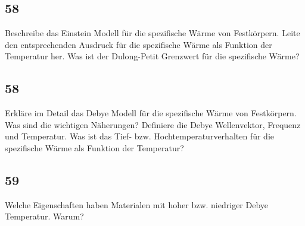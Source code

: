 \subsection{58}
\begin{myfrag}
Beschreibe das Einstein Modell für die spezifische Wärme von Festkörpern.
Leite den entsprechenden Ausdruck für die spezifische Wärme als Funktion
der Temperatur her. Was ist der Dulong-Petit Grenzwert für die spezifische
Wärme?
\end{myfrag}
\subsection{58}
\begin{myfrag}
Erkläre im Detail das Debye Modell für die spezifische Wärme von
Festkörpern. Was sind die wichtigen Näherungen? Definiere die Debye
Wellenvektor, Frequenz und Temperatur. Was ist das Tief- bzw.
Hochtemperaturverhalten für die spezifische Wärme als Funktion der
Temperatur?
\end{myfrag}
\subsection{59}
\begin{myfrag}
Welche Eigenschaften haben Materialen mit hoher bzw. niedriger Debye
Temperatur. Warum?
\end{myfrag}
